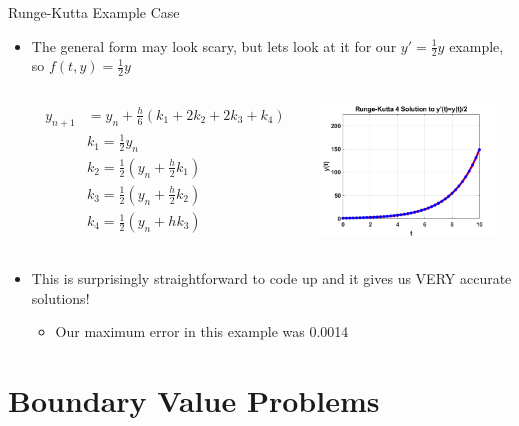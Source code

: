 {}\documentclass[letterpaper,
compress,
xcolor=x11names,
]{beamer}
\begin{document}

\begin{frame}{Runge-Kutta Example Case}
	\footnotesize
	\begin{itemize}
		\item The general form may look scary, but lets look at it for our $y' = \frac{1}{2}y$ example, so $f(t,y) = \frac{1}{2}y$
		\begin{columns}
			\begin{column}{0.6\linewidth}
				\begin{align*}
					y_{n+1} &= y_n + \frac{h}{6}(k_1 + 2k_2 + 2k_3 + k_4) \\
					&k_1 = \frac{1}{2}y_n \\
					&k_2 = \frac{1}{2} (y_n + \frac{h}{2}k_1) \\
					&k_3 = \frac{1}{2} (y_n + \frac{h}{2}k_2)\\
					&k_4 = \frac{1}{2} (y_n + hk_3)
				\end{align*}
			\end{column}
			\begin{column}{0.4\linewidth}
				\begin{center}
					\includegraphics[height = 3.5cm]{RK4_wSln.png}
				\end{center}
			\end{column}
		\end{columns}		
		\item This is surprisingly straightforward to code up and it gives us VERY accurate solutions!
		\begin{itemize}
			\item Our maximum error in this example was 0.0014
		\end{itemize}
	\end{itemize}
\end{frame}

\section{Boundary Value Problems}
\end{document}

